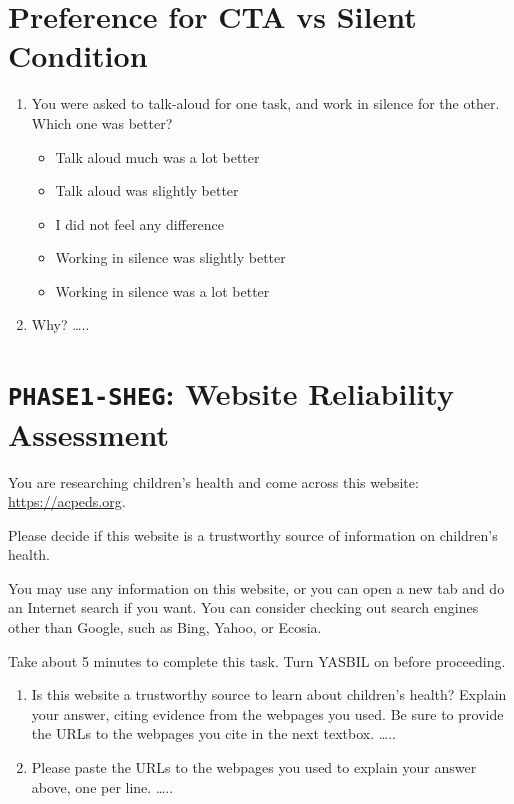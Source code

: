 \documentclass[letterpaper, nobind]{templates/ociamthesis}
\providecommand{\tightlist}{%
  \setlength{\itemsep}{0pt}\setlength{\parskip}{0pt}}
\begin{document}
\hypertarget{app-phase13-cta-v-silent}{%
\section{Preference for CTA vs Silent Condition}\label{app-phase13-cta-v-silent}}

\begin{enumerate}
\def\labelenumi{\arabic{enumi}.}
\tightlist
\item
  You were asked to talk-aloud for one task, and work in silence for the other. Which one was better?

  \begin{itemize}
  \tightlist
  \item
    Talk aloud much was a lot better
  \item
    Talk aloud was slightly better
  \item
    I did not feel any difference
  \item
    Working in silence was slightly better
  \item
    Working in silence was a lot better
  \end{itemize}
\item
  Why? \ldots..
\end{enumerate}

\hypertarget{app-phase1-sheg}{%
\section{\texorpdfstring{\texttt{PHASE1-SHEG}: Website Reliability Assessment}{PHASE1-SHEG: Website Reliability Assessment}}\label{app-phase1-sheg}}

You are researching children's health and come across this website: \url{https://acpeds.org}.

Please decide if this website is a trustworthy source of information on children's health.

You may use any information on this website, or you can open a new tab and do an Internet search if you want. You can consider checking out search engines other than Google, such as Bing, Yahoo, or Ecosia.

Take about 5 minutes to complete this task. Turn YASBIL on before proceeding.

\begin{enumerate}
\def\labelenumi{\arabic{enumi}.}
\tightlist
\item
  Is this website a trustworthy source to learn about children's health? Explain your answer, citing evidence from the webpages you used. Be sure to provide the URLs to the webpages you cite in the next textbox. \ldots..
\item
  Please paste the URLs to the webpages you used to explain your answer above, one per line. \ldots..
\end{enumerate}
\end{document}
